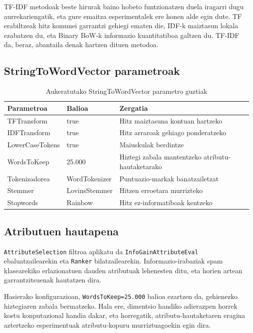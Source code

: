 \documentclass[12pt, a4paper]{article}
\begin{document}
TF-IDF metodoak beste hirurak baino hobeto funtzionatzen duela iragarri dugu aurrekariengatik, eta gure emaitza esperimentalek ere honen alde egin dute. TF erabiltzeak hitz komunei garrantzi gehiegi ematen die, IDF-k maiztasun lokala ezabatzen du, eta Binary BoW-k informazio kuantitatiboa galtzen du. TF-IDF da, beraz, abantaila denak hartzen dituen metodoa.


\subsection{StringToWordVector parametroak}

\begin{table}[H]
    \centering
    \caption{Aukeratutako StringToWordVector parametro guztiak}
    \begin{tabular}{lll}
        \toprule
        \textbf{Parametroa} & \textbf{Balioa} & \textbf{Zergatia} \\
        \midrule
        TFTransform     & true   & Hitz maiztasuna kontuan hartzeko \\
        IDFTransform    & true   & Hitz arraroak gehiago ponderatzeko \\
        LowerCaseTokens & true   & Maiuskulak berdintze \\
        WordsToKeep     & 25.000 & Hiztegi zabala mantentzeko atributu-hautaketarako \\
        Tokenizadorea   & WordTokenizer & Puntuazio-markak banatzailetzat \\
        Stemmer         & LovinsStemmer & Hitzen erroetara murrizteko \\
        Stopwords       & Rainbow & Hitz ez-informatiboak kentzeko \\
        \bottomrule
    \end{tabular}
    \label{tab:stwv}
\end{table}

\subsection{Atributuen hautapena}

\texttt{AttributeSelection} filtroa aplikatu da \texttt{InfoGainAttributeEval} ebaluatzailearekin eta \texttt{Ranker} bilatzailearekin. Informazio-irabaziak spam klasearekiko erlazionatuen dauden atributuak lehenesten ditu, eta horien artean garrantzitsuenak hautatzen dira.

Hasierako konfigurazioan, \texttt{WordsToKeep=25.000} balioa ezartzen da, gehienezko hiztegiaren zabala bermatzeko. Hala ere, dimentsio handiko adierazpen horrek kostu konputazional handia dakar, eta horregatik, atributu-hautaketaren eragina aztertzeko esperimentuak atributu-kopuru murriztuagoekin egin dira.
\end{document}
